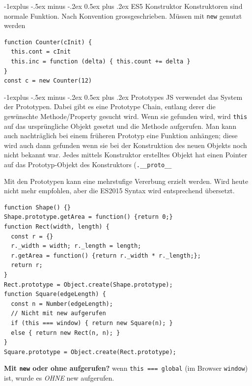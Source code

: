 \documentclass[a4paper, fontsize=6pt]{scrartcl}
\makeatletter
\renewcommand{\subsection}{\@startsection{subsection}{2}{0mm}%
    {-1explus -.5ex minus -.2ex}%
    {0.5ex plus .2ex}%
    {\normalfont\normalsize\bfseries}}
\newcommand{\js}[1]{\texttt{#1}}
\makeatother
\begin{document}
\begin{multicols*}{5}

\subsection{ES5 Konstruktor}
Konstruktoren sind normale Funktion. Nach Konvention grossgeschrieben. Müssen mit \js{new} genutzt werden
\begin{verbatim}
function Counter(cInit) {
  this.cont = cInit
  this.inc = function (delta) { this.count += delta }
}
const c = new Counter(12)
\end{verbatim}

\subsection{Prototypes}
JS verwendet das System der Prototypen. Dabei gibt es eine Prototype Chain, entlang derer die gewünschte Methode/Property gesucht wird. Wenn sie gefunden wird, wird \js{this} auf das ursprüngliche Objekt gesetzt und die Methode aufgerufen. Man kann auch nachträglich bei einem früheren Prototyp eine Funktion anhängen; diese wird auch dann gefunden wenn sie bei der Konstruktion des neuen Objekts noch nicht bekannt war. Jedes mittels Konstruktor erstelltes Objekt hat einen Pointer auf das Prototyp-Objekt des Konstruktors (\js{.\_\_proto\_\_}

Mit den Prototypen kann eine mehrstufige Vererbung erzielt werden. Wird heute nicht mehr empfohlen, aber die ES2015 Syntax wird entsprechend übersetzt.

\begin{verbatim}
function Shape() {}
Shape.prototype.getArea = function() {return 0;}
function Rect(width, length) {
  const r = {}
  r._width = width; r._length = length;
  r.getArea = function() {return r._width * r._length;};
  return r;
}
Rect.prototype = Object.create(Shape.prototype);
function Square(edgeLength) {
  const n = Number(edgeLength);
  // Nicht mit new aufgerufen
  if (this === window) { return new Square(n); }
  else { return new Rect(n, n); }
}
Square.prototype = Object.create(Rect.prototype);
\end{verbatim}

\textbf{Mit \js{new} oder ohne aufgerufen?} wenn \js{this === global} (im Browser \js{window}) ist, wurde es \textit{OHNE} new aufgerufen. 


\end{multicols*}
\end{document}
